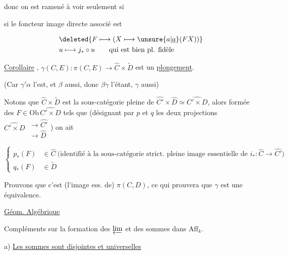 donc on est ramené à voir seulement si


si le foncteur image  directe associé est

\[
\begin{aligned}
&\deleted{F\longmapsto (X\longmapsto \unsure{a|\underline a}(FX))}\\
&u\longmapsto j_*\circ u\qquad\text{qui est bien pl. fidèle}
\end{aligned}
\]

\uline{Corollaire} , $\gamma(C,E):\pi(C,E)\longrightarrow\widehat C\times\widetilde D$ est un \uline{plongement}.

(Car $\gamma'\alpha$ l'est, et $\beta$ aussi, donc $\beta\gamma$ l'étant, $\gamma$ aussi)

Notons que  $\widehat C\times\widetilde D$ est la sous-catégorie  pleine de $\widehat {C'}\times\widehat D\simeq\widehat{C'\times D}$,  alors formée des $F\in\mathrm{Ob}\,\widehat{C'\times D}$ tels que (désignant par $p$ et $q$ les deux projections $\widehat{C'\times D}\ \substack{\to\widehat{C'}\\[-2pt]\to\widehat D}$) on ait

\[
\left\{\begin{aligned}
p_*(F)&\in\widehat C\ \text{(identifié à la sous-catégorie strict. pleine image essentielle de $i_*:\widehat C\to\widehat{C'}$)}\\
q_*(F)&\in\widetilde D
\end{aligned}\right.
\]

Prouvons que c'est  (l'image ess. de) $\pi(C,D)$, ce qui prouvera que $\gamma$ est une équivalence.


\uline{Géom. Algébrique}

Compléments sur la formation des $\varprojlim$ et des sommes dans $\mathrm{Aff}_k$.

a) \uline{Les sommes  sont disjointes et universelles}


